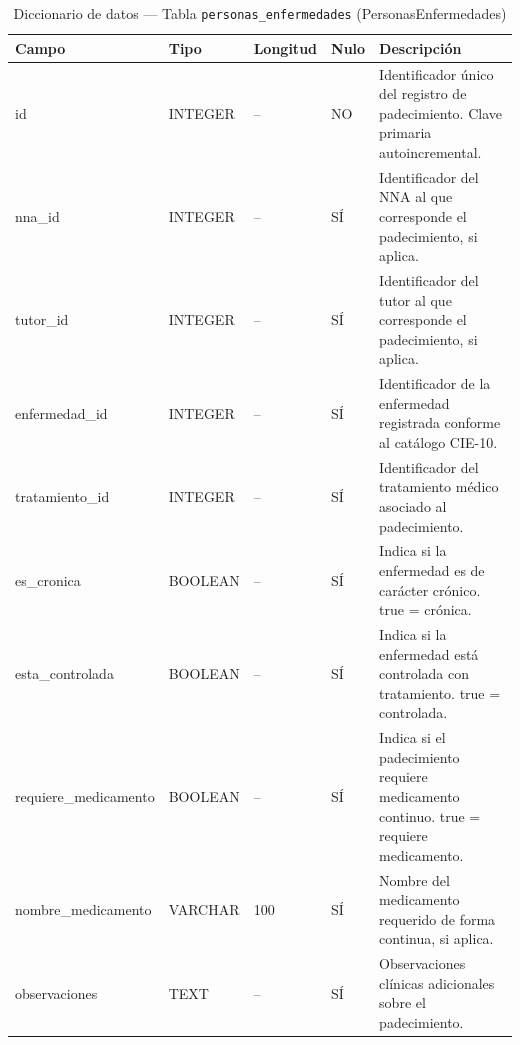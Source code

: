 \begin{table}[H]
	\centering
	\caption{Diccionario de datos --- Tabla \texttt{personas\_enfermedades} (PersonasEnfermedades)}
	\label{tab:data-dict-personas_enfermedades}
	\scriptsize
	\begin{tabular}{>{\ttfamily\raggedright\arraybackslash}p{3.6cm} p{1.6cm} p{1.3cm} p{0.7cm} p{5.6cm}}
		\toprule
		\textbf{Campo} & \textbf{Tipo} & \textbf{Longitud} & \textbf{Nulo} & \textbf{Descripción} \\
		\midrule
		id & INTEGER & -- & NO & Identificador único del registro de padecimiento. Clave primaria autoincremental. \\
		nna\_id & INTEGER & -- & SÍ & Identificador del NNA al que corresponde el padecimiento, si aplica. \\
		tutor\_id & INTEGER & -- & SÍ & Identificador del tutor al que corresponde el padecimiento, si aplica. \\
		enfermedad\_id & INTEGER & -- & SÍ & Identificador de la enfermedad registrada conforme al catálogo CIE-10. \\
		tratamiento\_id & INTEGER & -- & SÍ & Identificador del tratamiento médico asociado al padecimiento. \\
		es\_cronica & BOOLEAN & -- & SÍ & Indica si la enfermedad es de carácter crónico. true = crónica. \\
		esta\_controlada & BOOLEAN & -- & SÍ & Indica si la enfermedad está controlada con tratamiento. true = controlada. \\
		requiere\_medicamento & BOOLEAN & -- & SÍ & Indica si el padecimiento requiere medicamento continuo. true = requiere medicamento. \\
		nombre\_medicamento & VARCHAR & 100 & SÍ & Nombre del medicamento requerido de forma continua, si aplica. \\
		observaciones & TEXT & -- & SÍ & Observaciones clínicas adicionales sobre el padecimiento. \\
		\bottomrule
	\end{tabular}
\end{table}

